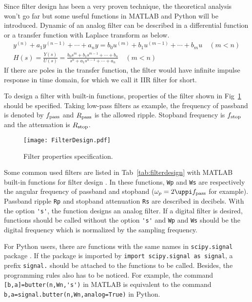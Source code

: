 Since filter design has been a very proven technique, the theoretical analysis won't go far but some useful functions in MATLAB and Python will be introduced. Dynamic of an analog filter can be described in a differential function or a transfer function with Laplace transform as below.
\begin{gather}
    y^{(n)} + a_1 y^{(n-1)} + \cdots + a_n y = b_0 u^{(m)} + b_1 u^{(m-1)} + \cdots + b_m u \quad (m < n) \\
    H(s) = \frac{Y(s)}{U(s)} = \frac{b_0 s^{m} + b_1 s^{m-1} + \cdots + b_n}{s^{n} + a_1 s^{n-1} + \cdots + a_n} \quad (m < n)
\end{gather}
If there are poles in the transfer function, the filter would have infinite impulse response in time domain, for which we call it IIR filter for short.


To design a filter with built-in functions, properties of the filter shown in Fig~\ref{fig:filterdesign} should be specified. Taking low-pass filters as example, the frequency of passband is denoted by $f_{\rm pass}$ and $R_{\rm pass}$ is the allowed ripple. Stopband frequency is $f_{\rm stop}$ and the attenuation is $R_{\rm stop}$.


\begin{figure}[!htb]
    \centering
    \texttt{[image: FilterDesign.pdf]}
    \caption{Filter properties specification.}
    \label{fig:filterdesign}
\end{figure}


Some common used filters are listed in Tab~\ref{tab:filterdesign} with MATLAB built-in functions for filter design \cite{matlabdoc}. In these functions, \verb|Wp| and \verb|Ws| are respectively the angular frequency of passband and stopband ($\omega_p = 2 \uppi f_{\rm pass}$ for example). Passband ripple \verb|Rp| and stopband attenuation \verb|Rs| are described in decibels. With the option \verb|'s'|, the function designs an analog filter. If a digital filter is desired, functions should be called without the option \verb|'s'| and \verb|Wp| and \verb|Ws| should be the digital frequency which is normalized by the sampling frequency.


For Python users, there are functions with the same names in \verb|scipy.signal| package \cite{scipydoc}. If the package is imported by \verb|import scipy.signal as signal|, a prefix \verb|signal.| should be attached to the functions to be called. Besides, the programming rules also has to be noticed. For example, the command \verb|[b,a]=butter(n,Wn,'s')| in MATLAB is equivalent to the command \verb|b,a=signal.butter(n,Wn,analog=True)| in Python.



